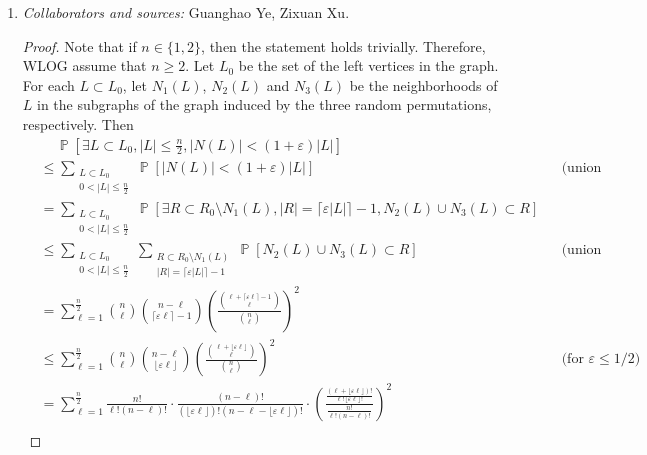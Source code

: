 \documentclass[letterpaper, reqno,11pt]{article}
\newcommand{\PP}{\mathop{{}\mathbb{P}}}
\begin{document}
\begin{enumerate}
  \item \noindent\emph{Collaborators and sources:} Guanghao Ye, Zixuan Xu.
  
  \begin{proof}
    Note that if $n \in \{ 1, 2 \}$, then the statement holds trivially. Therefore, WLOG assume that $n \geq 2$. Let $L_0$ be the set of the left vertices in the graph. For each $L \subset L_0$, let $N_1(L)$, $N_2(L)$ and $N_3(L)$ be the neighborhoods of $L$ in the subgraphs of the graph induced by the three random permutations, respectively. Then
    \begin{align}
      &\quad\, \PP\left[\exists L \subset L_0, |L| \leq \frac{n}{2}, |N(L)| < (1 + \varepsilon) |L|\right] \nonumber \\
      &\leq \sum_{\substack{L \subset L_0 \\ 0 < |L| \leq \frac{n}{2}}} \PP[|N(L)| < (1 + \varepsilon) |L|] && \text{(union bound)} \nonumber \\
      &= \sum_{\substack{L \subset L_0 \\ 0 < |L| \leq \frac{n}{2}}} \PP\left[\exists R \subset R_0 \setminus N_1(L), |R| = \lceil \varepsilon |L| \rceil  - 1, N_2(L) \cup N_3(L) \subset R\right] \nonumber \\
      &\leq \sum_{\substack{L \subset L_0 \\ 0 < |L| \leq \frac{n}{2}}} \sum_{\substack{R \subset R_0 \setminus N_1(L) \\ |R| = \lceil \varepsilon |L| \rceil - 1}} \PP\left[N_2(L) \cup N_3(L) \subset R\right] && \text{(union bound)} \nonumber \\
      &= \sum_{\ell = 1}^{\frac{n}{2}} \binom{n}{\ell} \binom{n - \ell}{\lceil \varepsilon \ell \rceil  - 1} \left(\frac{\binom{\ell + \lceil \varepsilon \ell \rceil  - 1}{\ell}}{\binom{n}{\ell}}\right)^2 \nonumber \\
      &\leq \sum_{\ell = 1}^{\frac{n}{2}} \binom{n}{\ell} \binom{n - \ell}{\lfloor \varepsilon \ell \rfloor} \left(\frac{\binom{\ell + \lfloor \varepsilon \ell \rfloor}{\ell}}{\binom{n}{\ell}}\right)^2 && \text{(for $\varepsilon \leq 1/2$)} \label{eq:binomial} \\
      &= \sum_{\ell = 1}^{\frac{n}{2}} \frac{n!}{\ell!(n - \ell)!} \cdot \frac{(n - \ell)!}{(\lfloor \varepsilon \ell \rfloor)!(n - \ell - \lfloor \varepsilon \ell \rfloor)!} \cdot \left(\frac{\frac{(\ell + \lfloor \varepsilon \ell \rfloor)!}{\ell!\lfloor\varepsilon\ell\rfloor!}}{\frac{n!}{\ell!(n - \ell)!}}\right)^2 \nonumber \\

\end{align}
\end{proof}
\end{enumerate}
\end{document}
